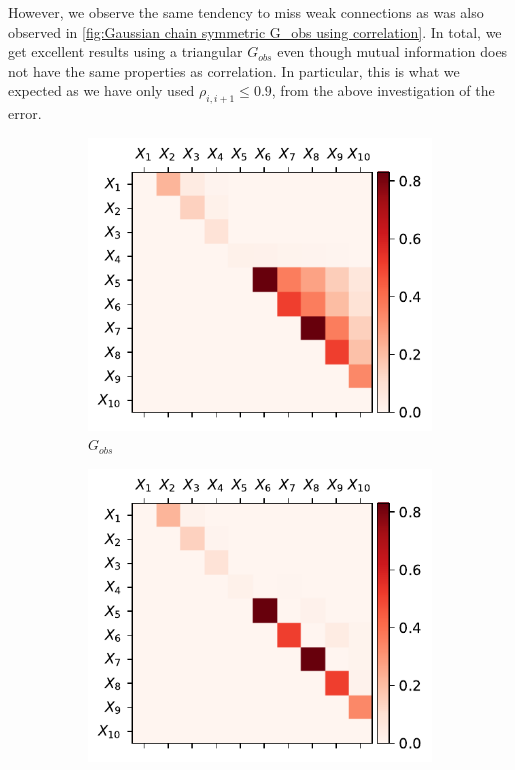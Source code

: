 \documentclass[../Thesis.tex]{subfiles}
\begin{document}
However, we observe the same tendency to miss weak connections as was also observed in \autoref{fig:Gaussian chain symmetric G_obs using correlation}. In total, we get excellent results using a triangular $G_{obs}$ even though mutual information does not have the same properties as correlation. In particular, this is what we expected as we have only used $\rho_{i,i+1} \leq 0.9$, from the above investigation of the error.
\newpage
\begin{figure}[H]
    \centering
    \begin{subfigure}[t]{0.49\textwidth}
        \centering
        \includegraphics[width=.95\linewidth]{figures/Gaussian Chain Theoretical/triangular G obs - MI.pdf}
        \caption{$G_{obs}$}
    \end{subfigure}
    \hfill
    \begin{subfigure}[t]{0.49\textwidth}
        \centering
        \includegraphics[width=.95\linewidth]{figures/Gaussian Chain Theoretical/G dir from triangular G obs - MI.pdf}

\end{subfigure}
\end{figure}
\end{document}
